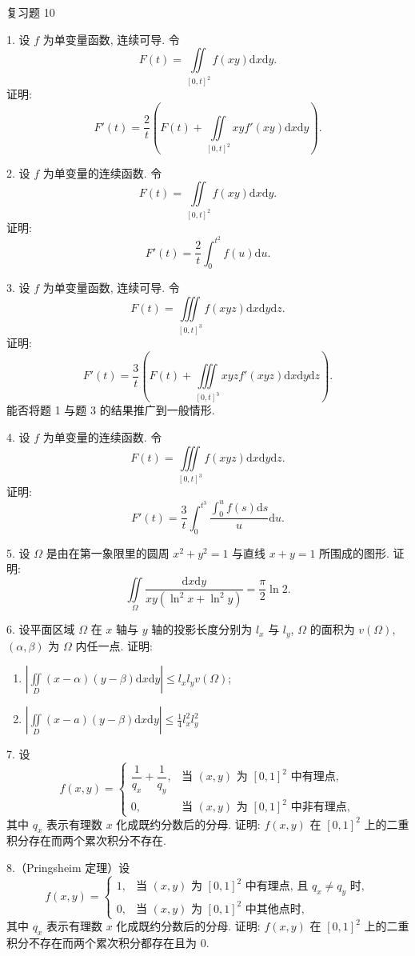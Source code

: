 \begin{exblock}{复习题 10}

1. 设 $f$ 为单变量函数, 连续可导. 令
\[
F(t) = \iint\limits_{[0,t]^{2}} f(xy) \mathrm{d}x\mathrm{d}y.
\]
证明:
\[
F'(t) = \frac{2}{t} \left( F(t) + \iint\limits_{[0,t]^{2}} xy f'(xy) \mathrm{d}x\mathrm{d}y \right).
\]

2. 设 $f$ 为单变量的连续函数. 令
\[
F(t) = \iint\limits_{[0,t]^{2}} f(xy) \mathrm{d}x\mathrm{d}y.
\]
证明:
\[
F'(t) = \frac{2}{t} \int_{0}^{t^{2}} f(u) \mathrm{d}u.
\]

3. 设 $f$ 为单变量函数, 连续可导. 令
\[
F(t) = \iiint\limits_{[0,t]^{3}} f(xyz) \mathrm{d}x\mathrm{d}y\mathrm{d}z.
\]
证明:
\[
F'(t) = \frac{3}{t} \left( F(t) + \iiint\limits_{[0,t]^{3}} xyz f'(xyz) \mathrm{d}x\mathrm{d}y\mathrm{d}z \right).
\]
能否将题 1 与题 3 的结果推广到一般情形.

4. 设 $f$ 为单变量的连续函数. 令
\[
F(t) = \iiint\limits_{[0,t]^{3}} f(xyz) \mathrm{d}x\mathrm{d}y\mathrm{d}z.
\]
证明:
\[
F'(t) = \frac{3}{t} \int_{0}^{t^{3}} \frac{\displaystyle\int_{0}^{u} f(s) \mathrm{d}s}{u} \mathrm{d}u.
\]

5. 设 $\Omega$ 是由在第一象限里的圆周 $x^{2}+y^{2}=1$ 与直线 $x+y=1$ 所围成的图形. 证明:
\[
\iint\limits_{\Omega} \frac{\mathrm{d}x\mathrm{d}y}{xy\left( \ln^{2}x + \ln^{2}y \right)}
= \frac{\pi}{2} \ln 2.
\]

6. 设平面区域 $\Omega$ 在 $x$ 轴与 $y$ 轴的投影长度分别为 $l_{x}$ 与 $l_{y}$,
$\Omega$ 的面积为 $v(\Omega)$, $(\alpha, \beta)$ 为 $\Omega$ 内任一点. 证明:
\begin{enumerate}
\item[(1)] $\displaystyle \left| \iint\limits_{D} (x-\alpha)(y-\beta) \mathrm{d}x\mathrm{d}y \right|
\leqslant l_{x} l_{y} v(\Omega)$;
\item[(2)] $\displaystyle \left| \iint\limits_{D} (x-a)(y-\beta) \mathrm{d}x\mathrm{d}y \right|
\leqslant \frac{1}{4} l_{x}^{2} l_{y}^{2}$
\end{enumerate}

7. 设
\[
f(x,y) = \begin{cases}
\dfrac{1}{q_{x}} + \dfrac{1}{q_{y}}, & \text{当 } (x,y) \text{ 为 } [0,1]^{2} \text{ 中有理点},\\
0, & \text{当 } (x,y) \text{ 为 } [0,1]^{2} \text{ 中非有理点},
\end{cases}
\]
其中 $q_{x}$ 表示有理数 $x$ 化成既约分数后的分母.
证明: $f(x,y)$ 在 $[0,1]^{2}$ 上的二重积分存在而两个累次积分不存在.

8.（Pringsheim 定理）设
\[
f(x,y) = \begin{cases}
1, & \text{当 } (x,y) \text{ 为 } [0,1]^{2} \text{ 中有理点, 且 } q_{x} \neq q_{y} \text{ 时},\\
0, & \text{当 } (x,y) \text{ 为 } [0,1]^{2} \text{ 中其他点时},
\end{cases}
\]
其中 $q_{x}$ 表示有理数 $x$ 化成既约分数后的分母.
证明: $f(x,y)$ 在 $[0,1]^{2}$ 上的二重积分不存在而两个累次积分都存在且为 0.


\end{exblock}
